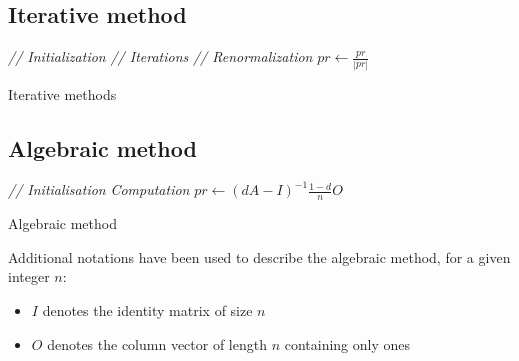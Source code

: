 \documentclass[pdftex,12pt,a4paper]{article}
\begin{document}
\subsection{Iterative method}
\IncMargin{1em}
\begin{algorithm}[H]
\BlankLine
\Indm
{}
\Indp
\BlankLine
\emph{// Initialization}\;
\emph{// Iterations}\;
\emph{// Renormalization}\;
$pr\leftarrow\frac{pr}{|pr|}$\;
\BlankLine
\caption{Iterative methods}\label{algo_iterative_method}
\end{algorithm}
\DecMargin{1em}

\subsection{Algebraic method}
\IncMargin{1em}
\begin{algorithm}[H]
\BlankLine
\Indm
{}
\Indp
\BlankLine
\emph{// Initialisation}\;
\emph{Computation}\;
$pr\leftarrow \left(dA-I\right)^{-1}\frac{1-d}{n}O$
\BlankLine
\caption{Algebraic method}\label{algebraic_method}
\end{algorithm}
\DecMargin{1em}

Additional notations have been used to describe the algebraic method, for a given integer $n$:
\begin{itemize}
\item $I$ denotes the identity matrix of size $n$
\item $O$ denotes the column vector of length $n$ containing only ones
\end{itemize}
\end{document}
